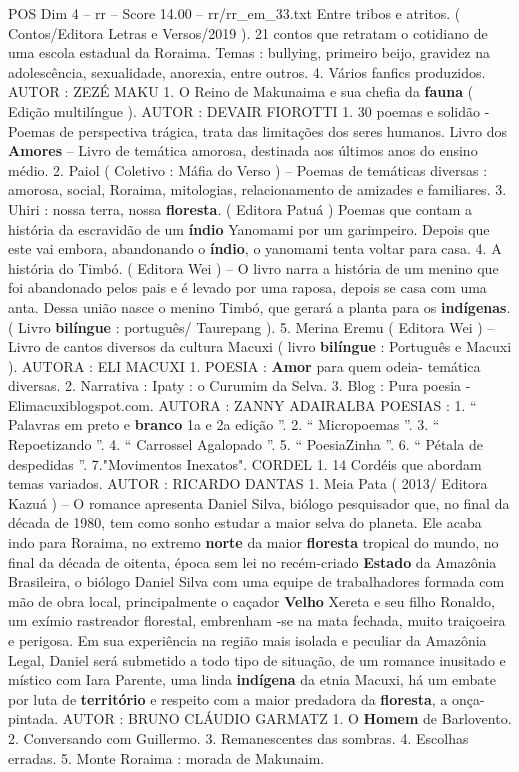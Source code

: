 \begin{textsample}{POS Dim 4 – rr – Score 14.00 – rr/rr\_em\_33.txt}
Entre tribos e atritos. ( Contos/Editora Letras e Versos/2019 ). 21 contos que retratam o cotidiano de uma escola estadual da Roraima.
Temas : bullying, primeiro beijo, gravidez na adolescência, sexualidade, anorexia, entre outros. 4.
Vários fanfics produzidos.
AUTOR : ZEZÉ MAKU 1.
O Reino de Makunaima e sua chefia da \textbf{fauna} ( Edição multilíngue ).
AUTOR : DEVAIR FIOROTTI 1. 30 poemas e solidão - Poemas de perspectiva trágica, trata das limitações dos seres humanos.
Livro dos \textbf{Amores} – Livro de temática amorosa, destinada aos últimos anos do ensino médio. 2.
Paiol ( Coletivo : Máfia do Verso ) – Poemas de temáticas diversas : amorosa, social, Roraima, mitologias, relacionamento de amizades e familiares. 3.
Uhiri : nossa terra, nossa \textbf{floresta}. ( Editora Patuá ) Poemas que contam a história da escravidão de um \textbf{índio} Yanomami por um garimpeiro.
Depois que este vai embora, abandonando o \textbf{índio}, o yanomami tenta voltar para casa. 4.
A história do Timbó. ( Editora Wei ) – O livro narra a história de um menino que foi abandonado pelos pais e é levado por uma raposa, depois se casa com uma anta.
Dessa união nasce o menino Timbó, que gerará a planta para os \textbf{indígenas}. ( Livro \textbf{bilíngue} : português/ Taurepang ). 5.
Merina Eremu ( Editora Wei ) – Livro de cantos diversos da cultura Macuxi ( livro \textbf{bilíngue} : Português e Macuxi ).
AUTORA : ELI MACUXI 1.
POESIA : \textbf{Amor} para quem odeia- temática diversas. 2.
Narrativa : Ipaty : o Curumim da Selva. 3.
Blog : Pura poesia - Elimacuxiblogspot.com.
AUTORA : ZANNY ADAIRALBA POESIAS : 1. “ Palavras em preto e \textbf{branco} 1a e 2a edição ”. 2. “ Micropoemas ”. 3. “ Repoetizando ”. 4. “ Carrossel Agalopado ”. 5. “ PoesiaZinha ”. 6. “ Pétala de despedidas ”. 7."Movimentos Inexatos".
CORDEL 1. 14 Cordéis que abordam temas variados.
AUTOR : RICARDO DANTAS 1.
Meia Pata ( 2013/ Editora Kazuá ) – O romance apresenta Daniel Silva, biólogo pesquisador que, no final da década de 1980, tem como sonho estudar a maior selva do planeta.
Ele acaba indo para Roraima, no extremo \textbf{norte} da maior \textbf{floresta} tropical do mundo, no final da década de oitenta, época sem lei no recém-criado \textbf{Estado} da Amazônia Brasileira, o biólogo Daniel Silva com uma equipe de trabalhadores formada com mão de obra local, principalmente o caçador \textbf{Velho} Xereta e seu filho Ronaldo, um exímio rastreador florestal, embrenham -se na mata fechada, muito traiçoeira e perigosa.
Em sua experiência na região mais isolada e peculiar da Amazônia Legal, Daniel será submetido a todo tipo de situação, de um romance inusitado e místico com Iara Parente, uma linda \textbf{indígena} da etnia Macuxi, há um embate por luta de \textbf{território} e respeito com a maior predadora da \textbf{floresta}, a onça-pintada.
AUTOR : BRUNO CLÁUDIO GARMATZ 1.
O \textbf{Homem} de Barlovento. 2.
Conversando com Guillermo. 3.
Remanescentes das sombras. 4.
Escolhas erradas. 5.
Monte Roraima : morada de Makunaim.

\end{textsample}
